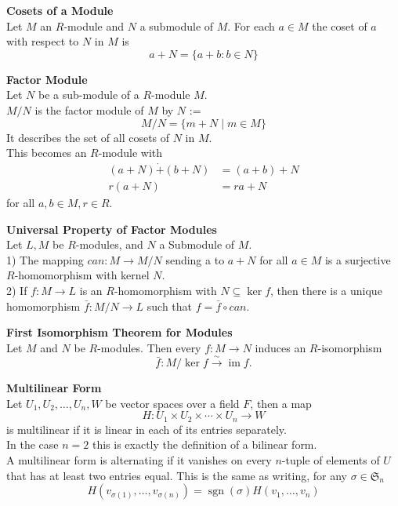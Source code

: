 \documentclass[a4paper, 10pt]{article}
\begin{document}
\begin{multicols*}{3}
\textbf{Cosets of a Module}\\
Let $M$ an $R$-module and $N$ a submodule of $M$. For each $a \in M$ the coset of $a$ with respect to $N$ in $M$ is
$$
a+N=\{a+b: b \in N\}
$$

\textbf{Factor Module}\\
Let $N$ be a sub-module of a $R$-module $M$. \\
$M / N$ is the factor module of $M$ by $N$ := 
$$M/N = \{m + N \mid m \in M\}$$
It describes the set of all cosets of $N$ in $M$. \\
This becomes an $R$-module with
$$
\begin{aligned}
(a+N) \dot{+}(b+N) & =(a+b)+N \\
r(a+N) & =r a+N
\end{aligned}
$$
for all $a, b \in M, r \in R$. 

\textbf{Universal Property of Factor Modules}\\
Let $L,M$ be $R$-modules, and $N$ a Submodule of $M$.\\
1) The mapping $can : M \rightarrow M / N$ sending a to $a+N$ for all $a \in M$ is a surjective $R$-homomorphism with kernel $N$.\\
2) If $f: M \rightarrow L$ is an $R$-homomorphism with $N \subseteq \operatorname{ker} f$, then there is a unique homomorphism $\bar{f}: M / N \rightarrow L$ such that $f=\bar{f} \circ can$.

\textbf{First Isomorphism Theorem for Modules}\\
Let $M$ and $N$ be $R$-modules. 
Then every $f: M \longrightarrow N$ induces an $R$-isomorphism
$$
\bar{f}: M / \operatorname{ker} f \xrightarrow{\sim} \operatorname{im} f .
$$

\textbf{Multilinear Form}\\
Let $U_1, U_2, \ldots, U_n, W$ be vector spaces over a field $F$, then a map
$$
H: U_1 \times U_2 \times \cdots \times U_n \rightarrow W
$$
is multilinear if it is linear in each of its entries separately.\\
In the case $n=2$ this is exactly the definition of a bilinear form.\\
A multilinear form is alternating if it vanishes on every $n$-tuple of elements of $U$ that has at least two entries equal.
This is the same as writing, for any $\sigma \in \mathfrak{S}_n$
$$
H\left(v_{\sigma(1)}, \ldots, v_{\sigma(n)}\right)=\operatorname{sgn}(\sigma) H\left(v_1, \ldots, v_n\right)
$$


\end{multicols*}
\end{document}
